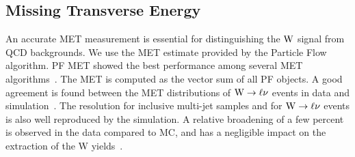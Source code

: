 %
\subsection{Missing Transverse Energy}
\label{sec:MET}
An accurate MET measurement is essential for distinguishing
the $\mathrm{W}$ signal from QCD backgrounds. 
We use the MET estimate provided by the Particle Flow algorithm.
PF MET showed the best performance
among several MET algorithms~\cite{PFMET}.
The MET is computed as the vector sum of all PF objects.
A good agreement is found between the MET
distributions of $\mathrm{W} \rightarrow \ell\nu$ events in data and simulation~\cite{metPAS}.
The resolution for inclusive multi-jet samples and for
$\mathrm{W} \rightarrow \ell\nu$ events is also well reproduced by the simulation.  
A relative broadening of a few percent is observed in the data compared to MC,  
and has a negligible impact on the
extraction of the W yields~\cite{WZCMS:2010}.
